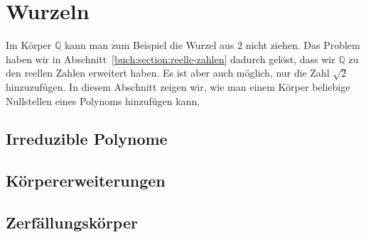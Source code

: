 %
%
%
\section{Wurzeln
\label{buch:section:wurzeln}}
Im Körper $\mathbb{Q}$ kann man zum Beispiel die Wurzel aus $2$ nicht 
ziehen.
Das Problem haben wir in Abschnitt~\ref{buch:section:reelle-zahlen}
dadurch gelöst, dass wir $\mathbb{Q}$ zu den reellen Zahlen
erweitert haben.
Es ist aber auch möglich, nur die Zahl $\sqrt{2}$ hinzuzufügen.
In diesem Abschnitt zeigen wir, wie man einem Körper beliebige 
Nullstellen eines Polynoms hinzufügen kann.

\subsection{Irreduzible Polynome}

\subsection{Körpererweiterungen}

\subsection{Zerfällungskörper}





